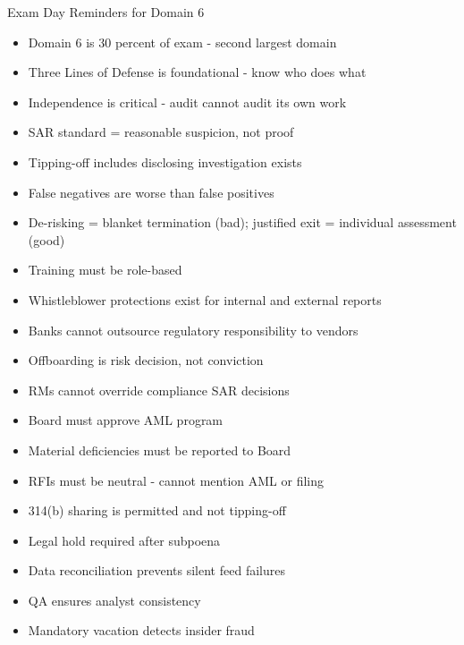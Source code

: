 \documentclass[11pt,a4paper]{beamer}
\begin{document}
\begin{frame}{Exam Day Reminders for Domain 6}
	\begin{itemize}
		\item Domain 6 is 30 percent of exam - second largest domain
		\item Three Lines of Defense is foundational - know who does what
		\item Independence is critical - audit cannot audit its own work
		\item SAR standard = reasonable suspicion, not proof
		\item Tipping-off includes disclosing investigation exists
		\item False negatives are worse than false positives
		\item De-risking = blanket termination (bad); justified exit = individual assessment (good)
		\item Training must be role-based
		\item Whistleblower protections exist for internal and external reports
		\item Banks cannot outsource regulatory responsibility to vendors
		\item Offboarding is risk decision, not conviction
		\item RMs cannot override compliance SAR decisions
		\item Board must approve AML program
		\item Material deficiencies must be reported to Board
		\item RFIs must be neutral - cannot mention AML or filing
		\item 314(b) sharing is permitted and not tipping-off
		\item Legal hold required after subpoena
		\item Data reconciliation prevents silent feed failures
		\item QA ensures analyst consistency
		\item Mandatory vacation detects insider fraud
	\end{itemize}
	\vspace{0.3cm}


\end{frame}
\end{document}
